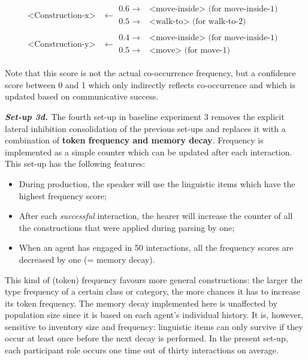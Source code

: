 \ea
\begin{align*}
\text{<Construction-x>} & \leftarrow  
\begin{array}{ll} 
0.6 \rightarrow & \text{<move-inside> (for move-inside-1) }\\
0.5 \rightarrow & \text{<walk-to> (for walk-to-2)}
\end{array}
\\
\text{<Construction-y>} & \leftarrow  
\begin{array}{ll} 
0.4 \rightarrow & \text{<move-inside> (for move-inside-1)} \\
0.5 \rightarrow & \text{<move> (for move-1)}
\end{array}
\end{align*}
\z

Note that this score is not the actual co-occurrence frequency, but a confidence score between 0 and 1 which only indirectly reflects co-occurrence and which is updated based on communicative success.


{\bfseries {\em Set-up 3d. }} The fourth set-up in baseline experiment 3 removes the explicit lateral inhibition consolidation of the previous set-ups and replaces it with a combination of {\bfseries token frequency and memory decay}. Frequency is implemented as a simple counter which can be updated after each interaction. This set-up has the following features:

\begin{itemize}
\item During production, the speaker will use the linguistic items which have the highest frequency score;
\item After each {\em successful} interaction, the hearer will increase the counter of all the constructions that were applied during parsing by one;
\item When an agent has engaged in 50 interactions, all the frequency scores are decreased by one (= memory decay).
\end{itemize}

This kind of (token) frequency favours more general constructions: the larger the type frequency of a certain class or category, the more chances it has to increase its token frequency. The memory decay implemented here is unaffected by population size since it is based on each agent's individual history. It is, however, sensitive to inventory size and frequency: linguistic items can only survive if they occur at least once before the next decay is performed. In the present set-up, each participant role occurs one time out of thirty interactions on average.

